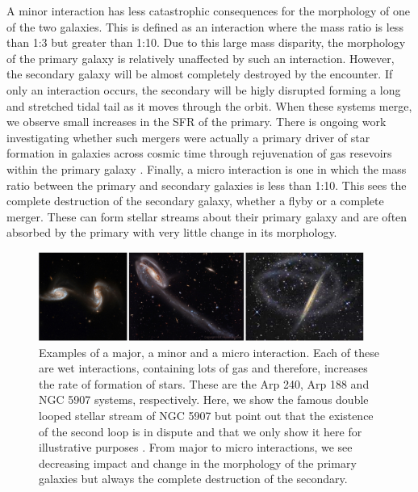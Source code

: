 A minor interaction has less catastrophic consequences for the morphology of one of the two galaxies. This is defined as an interaction where the mass ratio is less than 1:3 but greater than 1:10. Due to this large mass disparity, the morphology of the primary galaxy is relatively unaffected by such an interaction. However, the secondary galaxy will be almost completely destroyed by the encounter. If only an interaction occurs, the secondary will be higly disrupted forming a long and stretched tidal tail as it moves through the orbit. When these systems merge, we observe small increases in the SFR of the primary. There is ongoing work investigating whether such mergers were actually a primary driver of star formation in galaxies across cosmic time through rejuvenation of gas resevoirs within the primary galaxy \citep{2007A&A...476.1179B, 2014MNRAS.440.2944K, 2022MNRAS.511..607J}. Finally, a micro interaction is one in which the mass ratio between the primary and secondary galaxies is less than 1:10. This sees the complete destruction of the secondary galaxy, whether a flyby or a complete merger. These can form stellar streams about their primary galaxy and are often absorbed by the primary with very little change in its morphology.

\begin{figure}
\centering
\includegraphics[width=0.95\textwidth]{Introduction/figures/combined-examples-mergers.jpg}
\caption[Examples of a major, a minor and a micro interaction.]{Examples of a major, a minor and a micro interaction. Each of these are wet interactions, containing lots of gas and therefore, increases the rate of formation of stars. These are the Arp 240, Arp 188 and NGC 5907 systems, respectively. Here, we show the famous double looped stellar stream of NGC 5907 but point out that the existence of the second loop is in dispute and that we only show it here for illustrative purposes \citep{2019ApJ...883L..32V}. From major to micro interactions, we see decreasing impact and change in the morphology of the primary galaxies but always the complete destruction of the secondary.}
\label{fig:merger-clsfs}
\end{figure}

